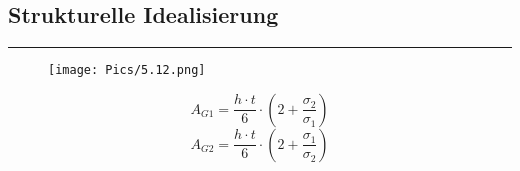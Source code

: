 \subsection{Strukturelle Idealisierung}
\noindent\rule[\linienAbstand]{\linewidth}{\linienDicke}

\begin{figure}[H]
  \centering
  \texttt{[image: Pics/5.12.png]}
\end{figure}

\begin{equation}
  A_{G1} = \frac{h \cdot t}{6}\cdot \left(2+ \frac{\sigma_2}{\sigma_1}\right)
\end{equation}
\begin{equation}
  A_{G2} = \frac{h \cdot t}{6}\cdot \left(2+ \frac{\sigma_1}{\sigma_2}\right)
\end{equation}






%
%
%
%
%
